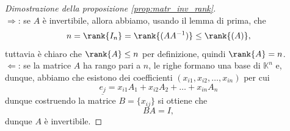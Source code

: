 \begin{proof}[Dimostrazione della proposizione \ref{prop:matr_inv_rank}] \hspace{1cm} \\
  $\boxed{\Rightarrow}$: se $A$ è invertibile, allora abbiamo, usando il lemma di prima, che
  $$
    n = \rank{I_n} = \rank{(AA^{-1})} \leq \rank{(A)},
  $$
  tuttavia è chiaro che $\rank{A} \leq n$ per definizione, quindi $\rank{A} = n$. \\
  $\boxed{\Leftarrow}$: se la matrice $A$ ha rango pari a $n$, le righe formano una base di $\mathbb{K}^n$ e, dunque, abbiamo che esistono dei coefficienti $(x_{i1}, x_{i2}, \ldots, x_{in})$ per cui
  $$
    \underline{e_j} = x_{i1} A_1 + x_{i2} A_2 + \ldots + x_{in} A_n
  $$
  dunque costruendo la matrice $B = \{x_{ij}\}$ si ottiene che
  $$
    BA = I,
  $$
  dunque $A$ è invertibile.
\end{proof}
